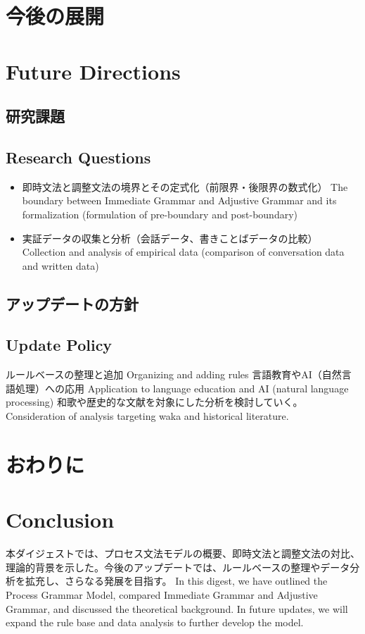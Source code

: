 \documentclass[a4paper,xelatex,ja=standard]{bxjsarticle}
\begin{document}
\ifJPN
  \section{今後の展開}
\else
  \section{Future Directions}
\fi

\ifJPN
  \subsection{研究課題}
\else
  \subsection{Research Questions}
\fi

\begin{itemize}
  \item 
\ifJPN
即時文法と調整文法の境界とその定式化（前限界・後限界の数式化）
\else
The boundary between Immediate Grammar and Adjustive Grammar and its formalization (formulation of pre-boundary and post-boundary)
\fi

  \item 
\ifJPN
実証データの収集と分析（会話データ、書きことばデータの比較）
\else
Collection and analysis of empirical data (comparison of conversation data and written data)
\fi
\end{itemize}

\ifJPN
  \subsection{アップデートの方針}
\else
  \subsection{Update Policy}
\fi

\ifJPN
ルールベースの整理と追加
\else
Organizing and adding rules
\fi
\ifJPN
言語教育やAI（自然言語処理）への応用
\else
Application to language education and AI (natural language processing)
\fi
\ifJPN
和歌や歴史的な文献を対象にした分析を検討していく。
\else
Consideration of analysis targeting waka and historical literature.
\fi

\ifJPN
  \section{おわりに}
\else
  \section{Conclusion}
\fi

\ifJPN
本ダイジェストでは、プロセス文法モデルの概要、即時文法と調整文法の対比、理論的背景を示した。今後のアップデートでは、ルールベースの整理やデータ分析を拡充し、さらなる発展を目指す。
\else
In this digest, we have outlined the Process Grammar Model, compared Immediate Grammar and Adjustive Grammar, and discussed the theoretical background. In future updates, we will expand the rule base and data analysis to further develop the model.
\fi

\appendix



\printbibliography
\end{document}
